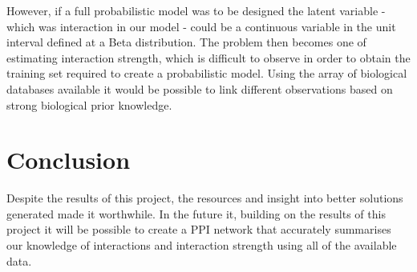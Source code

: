 However, if a full probabilistic model was to be designed the latent variable - which was interaction in our model - could be a continuous variable in the unit interval defined at a Beta distribution.
The problem then becomes one of estimating interaction strength, which is difficult to observe in order to obtain the training set required to create a probabilistic model.
Using the array of biological databases available it would be possible to link different observations based on strong biological prior knowledge.






\section*{Conclusion}

Despite the results of this project, the resources and insight into better solutions generated made it worthwhile.
In the future it, building on the results of this project it will be possible to create a PPI network that accurately summarises our knowledge of interactions and interaction strength using all of the available data.
